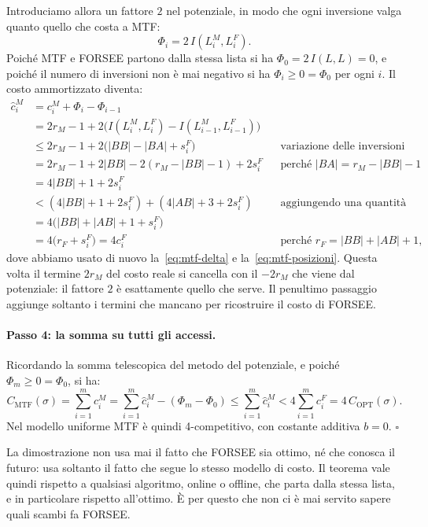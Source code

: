 Introduciamo allora un fattore $2$ nel potenziale, in modo che ogni inversione valga quanto quello che costa a MTF:
\[
\Phi_i = 2\, I(L^M_i, L^F_i).
\]
Poiché MTF e FORSEE partono dalla stessa lista si ha $\Phi_0 = 2\, I(L, L) = 0$, e poiché il numero di inversioni non è mai negativo si ha $\Phi_i \ge 0 = \Phi_0$ per ogni $i$. Il costo ammortizzato diventa:
\[
\begin{aligned}
\hat{c}^M_i &= c^M_i + \Phi_i - \Phi_{i-1} \\
&= 2r_M - 1 + 2\big(I(L^M_i, L^F_i) - I(L^M_{i-1}, L^F_{i-1})\big) \\
&\le 2r_M - 1 + 2\big(|BB| - |BA| + s^F_i\big) && \text{variazione delle inversioni} \\
&= 2r_M - 1 + 2|BB| - 2(r_M - |BB| - 1) + 2s^F_i && \text{perché } |BA| = r_M - |BB| - 1 \\
&= 4|BB| + 1 + 2s^F_i \\
&< (4|BB| + 1 + 2s^F_i) + (4|AB| + 3 + 2s^F_i) && \text{aggiungendo una quantità positiva} \\
&= 4\big(|BB| + |AB| + 1 + s^F_i\big) \\
&= 4\big(r_F + s^F_i\big) = 4c^F_i && \text{perché } r_F = |BB| + |AB| + 1,
\end{aligned}
\]
dove abbiamo usato di nuovo la~\eqref{eq:mtf-delta} e la~\eqref{eq:mtf-posizioni}. Questa volta il termine $2r_M$ del costo reale si cancella con il $-2r_M$ che viene dal potenziale: il fattore $2$ è esattamente quello che serve. Il penultimo passaggio aggiunge soltanto i termini che mancano per ricostruire il costo di FORSEE.

\paragraph{Passo 4: la somma su tutti gli accessi.}
Ricordando la somma telescopica del metodo del potenziale, e poiché $\Phi_m \ge 0 = \Phi_0$, si ha:
\[
C_{\mathrm{MTF}}(\sigma) = \sum_{i=1}^{m} c^M_i = \sum_{i=1}^{m} \hat{c}^M_i - (\Phi_m - \Phi_0) \le \sum_{i=1}^{m} \hat{c}^M_i < 4 \sum_{i=1}^{m} c^F_i = 4\, C_{\mathrm{OPT}}(\sigma).
\]
Nel modello uniforme MTF è quindi 4-competitivo, con costante additiva $b = 0$. \hfill $\square$

\begin{osservazione}
La dimostrazione non usa mai il fatto che FORSEE sia ottimo, né che conosca il futuro: usa soltanto il fatto che segue lo stesso modello di costo. Il teorema vale quindi rispetto a qualsiasi algoritmo, online o offline, che parta dalla stessa lista, e in particolare rispetto all'ottimo. È per questo che non ci è mai servito sapere quali scambi fa FORSEE.
\end{osservazione}

